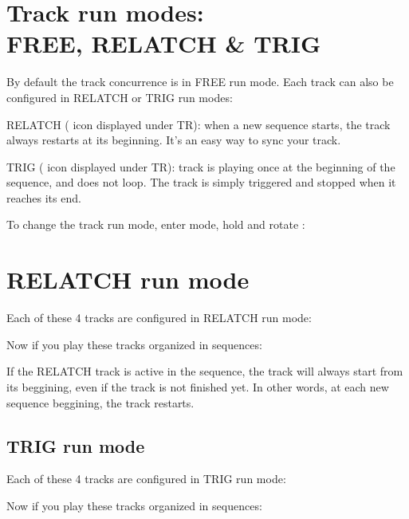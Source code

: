 \section{Track run modes:\\FREE, RELATCH \& TRIG}

By default the track concurrence is in FREE run mode. Each track can also be configured in RELATCH or TRIG run modes:

RELATCH ( icon displayed under TR): when a new sequence starts, the track always restarts at its beginning. It's an easy way to sync your track.

TRIG ( icon displayed under TR): track is playing once at the beginning of the sequence, and does not loop. The track is simply triggered and stopped when it reaches its end.

To change the track run mode, enter  mode, hold  and rotate \encodericon{}:




\section{RELATCH run mode}

Each of these 4 tracks are configured in RELATCH run mode:


Now if you play these tracks organized in sequences:


If the RELATCH track is active in the sequence, the track will always start from its beggining, even if the track is not finished yet. In other words, at each new sequence beggining, the track restarts.


\subsection{TRIG run mode}

Each of these 4 tracks are configured in TRIG run mode:


Now if you play these tracks organized in sequences:


